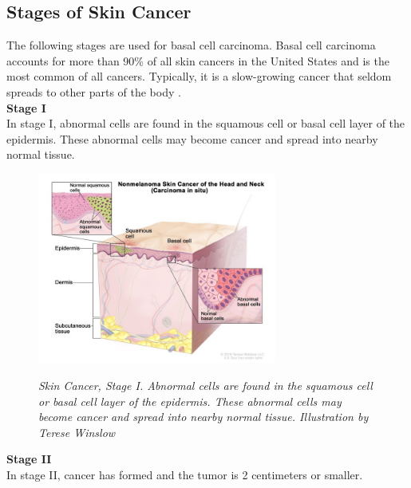 \newpage

\subsection{Stages of Skin Cancer}

The following stages are used for basal cell carcinoma. Basal cell carcinoma accounts for more than 90\% of all skin cancers in the United States and is the most common of all cancers. Typically, it is a slow-growing cancer that seldom spreads to other parts of the body \cite{CancerInstitute}. \\

\textbf{Stage I} \\

In stage I, abnormal cells are found in the squamous cell or basal cell layer of the epidermis. These abnormal cells may become cancer and spread into nearby normal tissue.

\begin{figure}[H]
\centering
\includegraphics[width=0.7\textwidth]{imatges/problem_domain/phase0-skin-cancer.jpg}
\caption[Skin Cancer, Stage I]{\textit{Skin Cancer, Stage I. Abnormal cells are found in the squamous cell or basal cell layer of the epidermis. These abnormal cells may become cancer and spread into nearby normal tissue. Illustration by Terese Winslow}}
{\label{fig:stage0-skin-canceer}}
\end{figure}

\textbf{Stage II} \\

In stage II, cancer has formed and the tumor is 2 centimeters or smaller.

